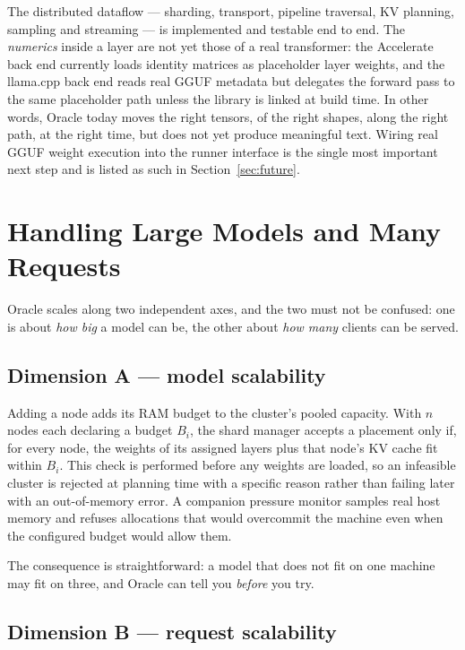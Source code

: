 \documentclass[11pt,a4paper]{article}
\begin{document}
The distributed dataflow --- sharding, transport, pipeline traversal, KV
planning, sampling and streaming --- is implemented and testable end to end.
The \emph{numerics} inside a layer are not yet those of a real transformer: the
Accelerate back end currently loads identity matrices as placeholder layer
weights, and the llama.cpp back end reads real GGUF metadata but delegates the
forward pass to the same placeholder path unless the library is linked at build
time. In other words, Oracle today moves the right tensors, of the right shapes,
along the right path, at the right time, but does not yet produce meaningful text.
Wiring real GGUF weight execution into the runner interface is the single most
important next step and is listed as such in Section~\ref{sec:future}.

\section{Handling Large Models and Many Requests}

Oracle scales along two independent axes, and the two must not be confused: one
is about \emph{how big} a model can be, the other about \emph{how many} clients
can be served.

\subsection{Dimension A --- model scalability}

Adding a node adds its RAM budget to the cluster's pooled capacity. With $n$
nodes each declaring a budget $B_i$, the shard manager accepts a placement only
if, for every node, the weights of its assigned layers plus that node's KV cache
fit within $B_i$. This check is performed before any weights are loaded, so an
infeasible cluster is rejected at planning time with a specific reason rather
than failing later with an out-of-memory error. A companion pressure monitor
samples real host memory and refuses allocations that would overcommit the
machine even when the configured budget would allow them.

The consequence is straightforward: a model that does not fit on one machine may
fit on three, and Oracle can tell you \emph{before} you try.

\subsection{Dimension B --- request scalability}
\end{document}
